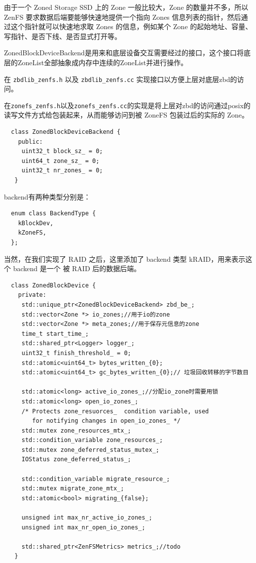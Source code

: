 由于一个 Zoned Storage SSD 上的 Zone 一般比较大，Zone 的数量并不多，所以 ZenFS 要求数据后端要能够快速地提供一个指向 Zones 信息列表的指针，然后通过这个指针就可以快速地求取 Zones 的信息，例如某个 Zone 的起始地址、容量、写指针、是否下线、是否显式打开等。


ZonedBlockDeviceBackend是用来和底层设备交互需要经过的接口，这个接口将底层的ZoneList全部抽象成内存中连续的ZoneList并进行操作。

在 \verb|zbdlib_zenfs.h| 以及 \verb|zbdlib_zenfs.cc| 实现接口以方便上层对底层zbd的访问。

在\verb|zonefs_zenfs.h|以及\verb|zonefs_zenfs.cc|的实现是将上层对zbd的访问通过posix的读写文件方式给包装起来，从而能够访问到被 ZoneFS 包装过后的实际的 Zone。

\begin{lstlisting}
  class ZonedBlockDeviceBackend {
    public:
     uint32_t block_sz_ = 0;
     uint64_t zone_sz_ = 0;
     uint32_t nr_zones_ = 0;
   }   
\end{lstlisting}

backend有两种类型分别是：

\begin{lstlisting}
  enum class BackendType {
    kBlockDev,
    kZoneFS,
  };
\end{lstlisting}

当然，在我们实现了 RAID 之后，这里添加了 backend 类型 kRAID，用来表示这个 backend 是一个 被 RAID 后的数据后端。


\begin{lstlisting}
  class ZonedBlockDevice {
    private:
     std::unique_ptr<ZonedBlockDeviceBackend> zbd_be_;
     std::vector<Zone *> io_zones;//用于io的zone
     std::vector<Zone *> meta_zones;//用于保存元信息的zone
     time_t start_time_;
     std::shared_ptr<Logger> logger_;
     uint32_t finish_threshold_ = 0;
     std::atomic<uint64_t> bytes_written_{0};
     std::atomic<uint64_t> gc_bytes_written_{0};// 垃圾回收转移的字节数目
   
     std::atomic<long> active_io_zones_;//分配io_zone时需要用锁
     std::atomic<long> open_io_zones_;
     /* Protects zone_resuorces_  condition variable, used
        for notifying changes in open_io_zones_ */
     std::mutex zone_resources_mtx_;
     std::condition_variable zone_resources_;
     std::mutex zone_deferred_status_mutex_;
     IOStatus zone_deferred_status_;
   
     std::condition_variable migrate_resource_;
     std::mutex migrate_zone_mtx_;
     std::atomic<bool> migrating_{false};
   
     unsigned int max_nr_active_io_zones_;
     unsigned int max_nr_open_io_zones_;
   
     std::shared_ptr<ZenFSMetrics> metrics_;//todo
   }   
\end{lstlisting}

